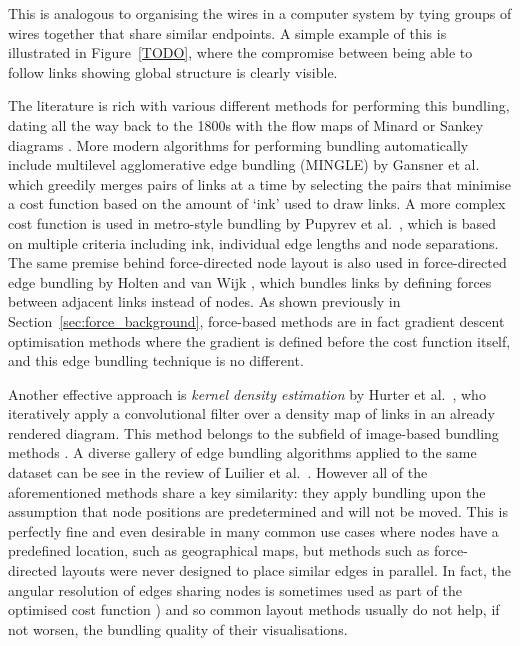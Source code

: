 This is analogous to organising the wires in a computer system by tying groups of wires together that share similar endpoints. A simple example of this is illustrated in Figure~\ref{TODO}, where the compromise between being able to follow links showing global structure is clearly visible.

The literature is rich with various different methods for performing this bundling, dating all the way back to the 1800s with the flow maps of Minard \cite{Minard1862} or Sankey diagrams \cite{Sankey1896}.
More modern algorithms for performing bundling automatically include multilevel agglomerative edge bundling (MINGLE) by Gansner et al.~\cite{Gansner2011} which greedily merges pairs of links at a time by selecting the pairs that minimise a cost function based on the amount of `ink' used to draw links. A more complex cost function is used in metro-style bundling by Pupyrev et al.~\cite{Pupyrev2016}, which is based on multiple criteria including ink, individual edge lengths and node separations. 
The same premise behind force-directed node layout is also used in force-directed edge bundling by Holten and van Wijk \cite{Holten2009}, which bundles links by defining forces between adjacent links instead of nodes. As shown previously in Section~\ref{sec:force_background}, force-based methods are in fact gradient descent optimisation methods where the gradient is defined before the cost function itself, and this edge bundling technique is no different.

Another effective approach is \emph{kernel density estimation} by Hurter et al.~\cite{Hurter2012}, who iteratively apply a convolutional filter over a density map of links in an already rendered diagram. This method belongs to the subfield of image-based bundling methods \cite{Telea2018,TODO}. A diverse gallery of edge bundling algorithms applied to the same dataset can be see in the review of Luilier et al.~\cite[Fig.~4]{Luilier2017}.
However all of the aforementioned methods share a key similarity: they apply bundling upon the assumption that node positions are predetermined and will not be moved. This is perfectly fine and even desirable in many common use cases where nodes have a predefined location, such as geographical maps, but methods such as force-directed layouts were never designed to place similar edges in parallel. In fact, the angular resolution of edges sharing nodes is sometimes used as part of the optimised cost function \cite{Argyriou2010}) and so common layout methods usually do not help, if not worsen, the bundling quality of their visualisations.

